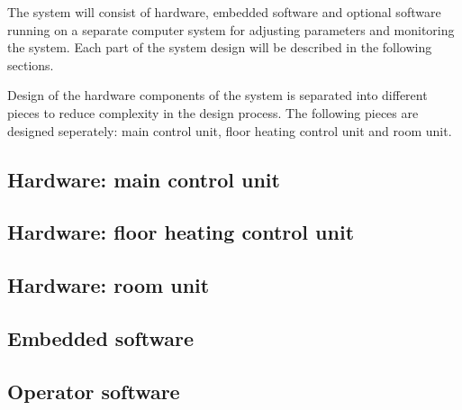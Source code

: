 The system will consist of hardware, embedded software and optional
software running on a separate computer system for adjusting
parameters and monitoring the system. Each part of the system design
will be described in the following sections.

Design of the hardware components of the system is separated into
different pieces to reduce complexity in the design process. The
following pieces are designed seperately: main control unit, floor
heating control unit and room unit.


\subsection{Hardware: main control unit}


\subsection{Hardware: floor heating control unit}


\subsection{Hardware: room unit}


\subsection{Embedded software}


\subsection{Operator software}

